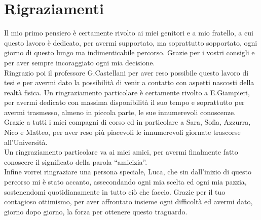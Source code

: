 \clearpage{\pagestyle{empty}\cleardoublepage}
\chapter*{Rigraziamenti}
\fancyhf{} %
\addtolength{\parskip}{- 5pt}

Il mio primo pensiero è certamente rivolto ai miei genitori e a mio fratello, a cui questo lavoro è dedicato, per avermi supportato, ma soprattutto sopportato, ogni giorno di questo lungo ma indimenticabile percorso. 
Grazie per i vostri consigli e per aver sempre incoraggiato ogni mia decisione.\\
Ringrazio poi il professore G.Castellani per aver reso possibile questo lavoro di tesi e per avermi dato la possibilità di venir a contatto con aspetti nascosti della realtà fisica. 
Un ringraziamento particolare è certamente rivolto a E.Giampieri, per avermi dedicato con massima disponibilità il suo tempo e soprattutto per avermi trasmesso, almeno in piccola parte, le sue innumerevoli conoscenze.\\
Grazie a tutti i miei compagni di corso ed in particolare a Sara, Sofia, Azzurra, Nico e Matteo, per aver reso più piacevoli le innumerevoli giornate trascorse all'Università. \\
Un ringraziamento particolare va ai miei amici, per avermi finalmente fatto conoscere il significato della parola ``amicizia''.\\
Infine vorrei ringraziare una persona speciale, Luca, che sin dall'inizio di questo percorso mi è stato accanto, assecondando ogni mia scelta ed ogni mia pazzia, sostenendomi quotidianamente in tutto ciò che faccio. Grazie per il tuo contagioso ottimismo, per aver affrontato insieme ogni difficoltà ed avermi dato, giorno dopo giorno, la forza per ottenere questo traguardo.